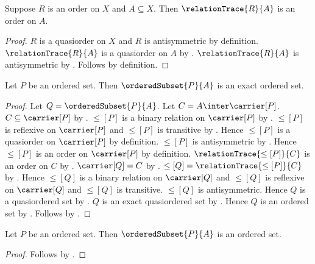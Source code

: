 \begin{proposition}\label{relation_trace_order_on}
    Suppose $R$ is an order on $X$ and $A\subseteq X$.
    Then $\relationTrace{R}{A}$ is an order on $A$.
\end{proposition}
\begin{proof}
    $R$ is a quasiorder on $X$ and $R$ is antisymmetric by
        definition.
    $\relationTrace{R}{A}$ is a quasiorder on $A$ by
        .
    $\relationTrace{R}{A}$ is antisymmetric by
        .
    Follows by definition.
\end{proof}

\begin{theorem}\label{ordered_subset_is_exact_ordered_set}
    Let $P$ be an ordered set.
    Then $\orderedSubset{P}{A}$ is an exact ordered set.
\end{theorem}
\begin{proof}
    Let $Q=\orderedSubset{P}{A}$.
    Let $C=A\inter\carrier[P]$.
    $C\subseteq\carrier[P]$ by .
    $\leq[P]$ is a binary relation on $\carrier[P]$ by
        .
    $\leq[P]$ is reflexive on $\carrier[P]$ and
        $\leq[P]$ is transitive by
        .
    Hence $\leq[P]$ is a quasiorder on $\carrier[P]$ by
        definition.
    $\leq[P]$ is antisymmetric by .
    Hence $\leq[P]$ is an order on $\carrier[P]$ by definition.
    $\relationTrace{\leq[P]}{C}$ is an order on $C$ by
        .
    $\carrier[Q]=C$ by .
    $\leq[Q]=\relationTrace{\leq[P]}{C}$ by
        .
    Hence $\leq[Q]$ is a binary relation on $\carrier[Q]$ and
        $\leq[Q]$ is reflexive on $\carrier[Q]$ and
        $\leq[Q]$ is transitive.
    $\leq[Q]$ is antisymmetric.
    Hence $Q$ is a quasiordered set by
        .
    $Q$ is an exact quasiordered set by
        .
    Hence $Q$ is an ordered set by .
    Follows by
        .
\end{proof}

\begin{classification}\label{ordered_subset_is_ordered_set}
    Let $P$ be an ordered set.
    Then $\orderedSubset{P}{A}$ is an ordered set.
\end{classification}
\begin{proof}
    Follows by .
\end{proof}


